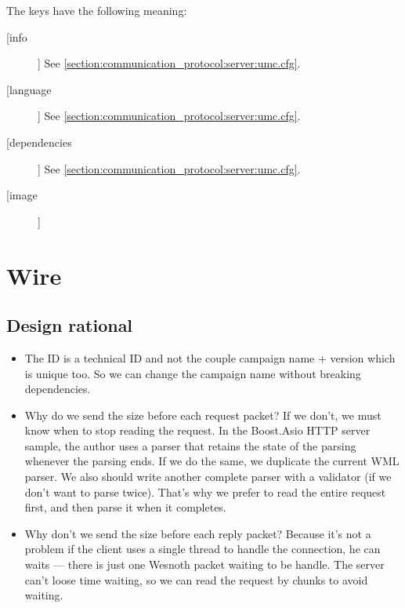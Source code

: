 The keys have the following meaning:
\begin{description}
\item[[info]]
	See \cref{section:communication_protocol:server:umc.cfg}.

\item[[language]]
  See \cref{section:communication_protocol:server:umc.cfg}.

\item[[dependencies]]
	See \cref{section:communication_protocol:server:umc.cfg}.

\item[[image]]

\end{description}

\section{Wire}
\label{section:communication_protocol:wire}

\subsection{Design rational}

\begin{itemize}
 \item The ID is a technical ID and not the couple campaign name + version which is unique too. So we can change the campaign name without breaking dependencies.
 \item Why do we send the size before each request packet? If we don't, we must know when to stop reading the request. In the Boost.Asio HTTP server sample, the author uses a parser that retains the state of the parsing whenever the parsing ends. If we do the same, we duplicate the current WML parser. We also should write another complete parser with a validator (if we don't want to parse twice). That's why we prefer to read the entire request first, and then parse it when it completes.
 \item Why don't we send the size before each reply packet? Because it's not a problem if the client uses a single thread to handle the connection, he can waits — there is just one Wesnoth packet waiting to be handle. The server can't loose time waiting, so we can read the request by chunks to avoid waiting.

\end{itemize}

